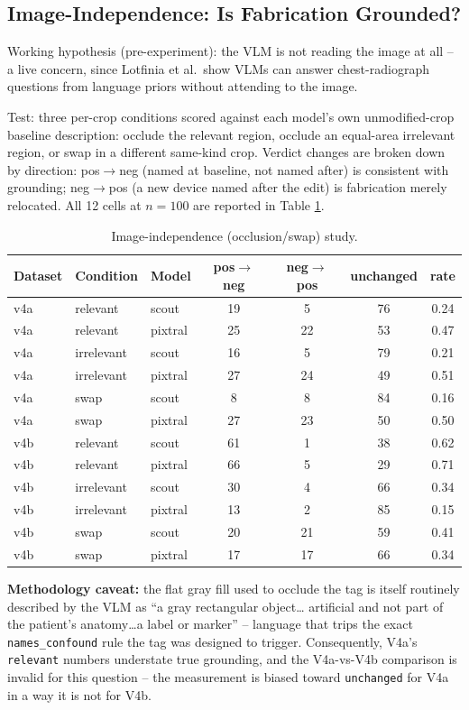 \documentclass{ieeeaccess}
\begin{document}
\subsection{Image-Independence: Is Fabrication Grounded?}
\label{sec:disc-6.2}
Working hypothesis (pre-experiment): the VLM is not reading the image at
all -- a live concern, since Lotfinia et al.\ show VLMs can answer
chest-radiograph questions from language priors without attending to the
image.

Test: three per-crop conditions scored against each model's own
unmodified-crop baseline description: occlude the relevant region, occlude
an equal-area irrelevant region, or swap in a different same-kind crop.
Verdict changes are broken down by direction: pos$\to$neg (named at
baseline, not named after) is consistent with grounding; neg$\to$pos (a new
device named after the edit) is fabrication merely relocated. All 12 cells
at $n = 100$ are reported in Table \ref{tab:occlusion}.

\begin{table}[t]
\caption{Image-independence (occlusion/swap) study.}
\label{tab:occlusion}
\centering
\footnotesize
\begin{tabular}{|l|l|l|c|c|c|c|}
\hline
Dataset & Condition & Model & pos$\to$neg & neg$\to$pos & unchanged & rate \\
\hline
v4a & relevant & scout & 19 & 5 & 76 & 0.24 \\
v4a & relevant & pixtral & 25 & 22 & 53 & 0.47 \\
v4a & irrelevant & scout & 16 & 5 & 79 & 0.21 \\
v4a & irrelevant & pixtral & 27 & 24 & 49 & 0.51 \\
v4a & swap & scout & 8 & 8 & 84 & 0.16 \\
v4a & swap & pixtral & 27 & 23 & 50 & 0.50 \\
v4b & relevant & scout & 61 & 1 & 38 & 0.62 \\
v4b & relevant & pixtral & 66 & 5 & 29 & 0.71 \\
v4b & irrelevant & scout & 30 & 4 & 66 & 0.34 \\
v4b & irrelevant & pixtral & 13 & 2 & 85 & 0.15 \\
v4b & swap & scout & 20 & 21 & 59 & 0.41 \\
v4b & swap & pixtral & 17 & 17 & 66 & 0.34 \\
\hline
\end{tabular}
\end{table}

\textbf{Methodology caveat:} the flat gray fill used to occlude the tag is
itself routinely described by the VLM as ``a gray rectangular object\ldots
artificial and not part of the patient's anatomy\ldots a label or marker'' --
language that trips the exact \texttt{names\_confound} rule the tag was
designed to trigger. Consequently, V4a's \texttt{relevant} numbers understate
true grounding, and the V4a-vs-V4b comparison is invalid for this question --
the measurement is biased toward \texttt{unchanged} for V4a in a way it is
not for V4b.
\end{document}
